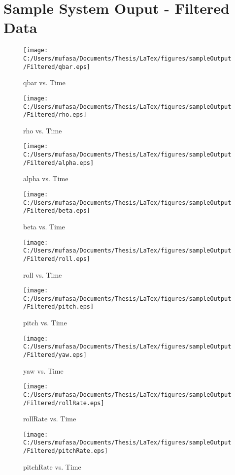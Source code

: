 \section{Sample System Ouput - Filtered Data}
\begin{figure}[]
	\centering
	\caption{qbar vs. Time}
		\texttt{[image: C:/Users/mufasa/Documents/Thesis/LaTex/figures/sampleOutput/Filtered/qbar.eps]}
\end{figure}
\begin{figure}[]
	\centering
	\caption{rho vs. Time}
		\texttt{[image: C:/Users/mufasa/Documents/Thesis/LaTex/figures/sampleOutput/Filtered/rho.eps]}
\end{figure}
\clearpage
\begin{figure}[]
	\centering
	\caption{alpha vs. Time}
		\texttt{[image: C:/Users/mufasa/Documents/Thesis/LaTex/figures/sampleOutput/Filtered/alpha.eps]}
\end{figure}
\begin{figure}[]
	\centering
	\caption{beta vs. Time}
		\texttt{[image: C:/Users/mufasa/Documents/Thesis/LaTex/figures/sampleOutput/Filtered/beta.eps]}
\end{figure}
\begin{figure}[]
	\centering
	\caption{roll vs. Time}
		\texttt{[image: C:/Users/mufasa/Documents/Thesis/LaTex/figures/sampleOutput/Filtered/roll.eps]}
\end{figure}
\begin{figure}[]
	\centering
	\caption{pitch vs. Time}
		\texttt{[image: C:/Users/mufasa/Documents/Thesis/LaTex/figures/sampleOutput/Filtered/pitch.eps]}
\end{figure}
\begin{figure}[]
	\centering
	\caption{yaw vs. Time}
		\texttt{[image: C:/Users/mufasa/Documents/Thesis/LaTex/figures/sampleOutput/Filtered/yaw.eps]}
\end{figure}
\begin{figure}[]
	\centering
	\caption{rollRate vs. Time}
		\texttt{[image: C:/Users/mufasa/Documents/Thesis/LaTex/figures/sampleOutput/Filtered/rollRate.eps]}
\end{figure}
\begin{figure}[]
	\centering
	\caption{pitchRate vs. Time}
		\texttt{[image: C:/Users/mufasa/Documents/Thesis/LaTex/figures/sampleOutput/Filtered/pitchRate.eps]}
\end{figure}
